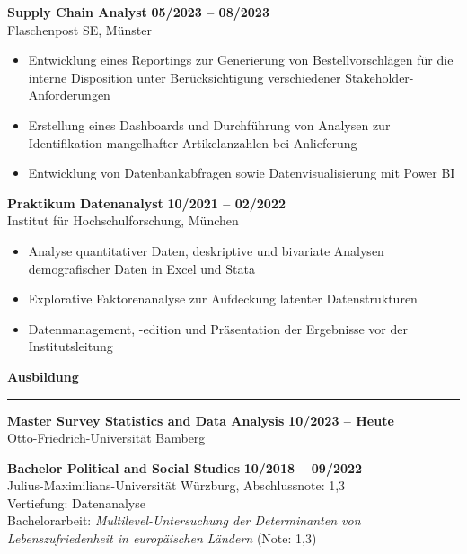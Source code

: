 \documentclass[11pt,a4paper]{article}
\newcommand{\sectiontitle}[1]{
    {\large \textbf{#1}} \vspace{0.2cm} \hrule \vspace{0.5cm}
}
\begin{document}
\textbf{Supply Chain Analyst} \hfill \textbf{05/2023 – 08/2023} \\
Flaschenpost SE, Münster \\
\vspace{0.1cm}
\begin{itemize}[leftmargin=*, noitemsep, topsep=0pt]
\item Entwicklung eines Reportings zur Generierung von Bestellvorschlägen für die interne Disposition unter Berücksichtigung verschiedener Stakeholder-Anforderungen
\item Erstellung eines Dashboards und Durchführung von Analysen zur Identifikation mangelhafter Artikelanzahlen bei Anlieferung
\item Entwicklung von Datenbankabfragen sowie Datenvisualisierung mit Power BI
\end{itemize}
\vspace{0.3cm}

\textbf{Praktikum Datenanalyst} \hfill \textbf{10/2021 – 02/2022} \\
Institut für Hochschulforschung, München \\
\vspace{0.1cm}
\begin{itemize}[leftmargin=*, noitemsep, topsep=0pt]
\item Analyse quantitativer Daten, deskriptive und bivariate Analysen demografischer Daten in Excel und Stata
\item Explorative Faktorenanalyse zur Aufdeckung latenter Datenstrukturen
\item Datenmanagement, -edition und Präsentation der Ergebnisse vor der Institutsleitung
\end{itemize}

\vspace{0.5cm}

\sectiontitle{Ausbildung}

\textbf{Master Survey Statistics and Data Analysis} \hfill \textbf{10/2023 – Heute} \\
Otto-Friedrich-Universität Bamberg
\vspace{0.3cm}

\textbf{Bachelor Political and Social Studies} \hfill \textbf{10/2018 – 09/2022} \\
Julius-Maximilians-Universität Würzburg, Abschlussnote: 1,3 \\
Vertiefung: Datenanalyse \\
Bachelorarbeit: \textit{Multilevel-Untersuchung der Determinanten von Lebenszufriedenheit in europäischen Ländern} (Note: 1,3)
\vspace{0.3cm}
\end{document}
